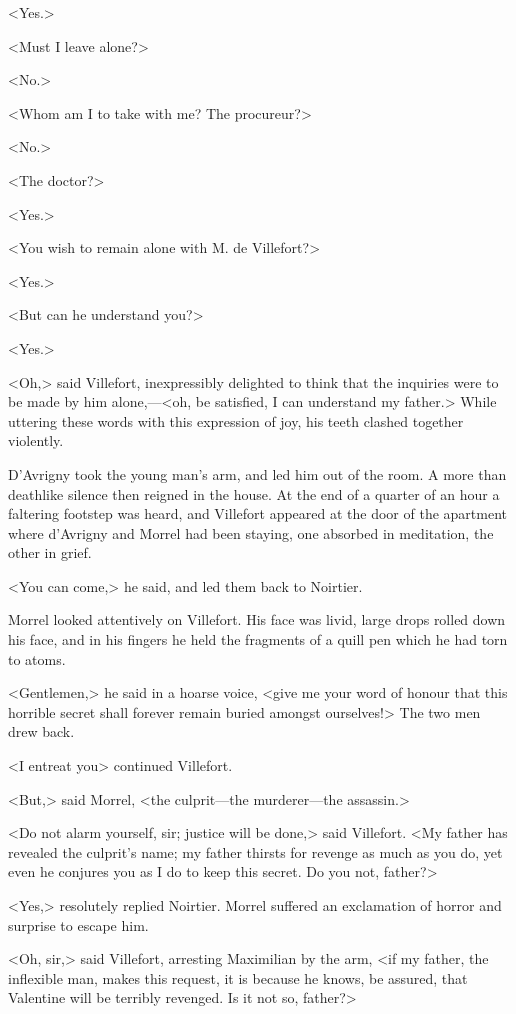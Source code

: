  <Yes.> 

 <Must I leave alone?> 

 <No.> 

 <Whom am I to take with me? The procureur?> 

 <No.> 

 <The doctor?> 

 <Yes.> 

 <You wish to remain alone with M. de Villefort?> 

 <Yes.> 

 <But can he understand you?> 

 <Yes.> 

 <Oh,> said Villefort, inexpressibly delighted to think that the inquiries were to be made by him alone,—<oh, be satisfied, I can understand my father.> While uttering these words with this expression of joy, his teeth clashed together violently. 

 D'Avrigny took the young man's arm, and led him out of the room. A more than deathlike silence then reigned in the house. At the end of a quarter of an hour a faltering footstep was heard, and Villefort appeared at the door of the apartment where d'Avrigny and Morrel had been staying, one absorbed in meditation, the other in grief. 

 <You can come,> he said, and led them back to Noirtier. 

 Morrel looked attentively on Villefort. His face was livid, large drops rolled down his face, and in his fingers he held the fragments of a quill pen which he had torn to atoms. 

 <Gentlemen,> he said in a hoarse voice, <give me your word of honour that this horrible secret shall forever remain buried amongst ourselves!> The two men drew back. 

 <I entreat you\longdash> continued Villefort. 

 <But,> said Morrel, <the culprit—the murderer—the assassin.> 

 <Do not alarm yourself, sir; justice will be done,> said Villefort. <My father has revealed the culprit's name; my father thirsts for revenge as much as you do, yet even he conjures you as I do to keep this secret. Do you not, father?> 

 <Yes,> resolutely replied Noirtier. Morrel suffered an exclamation of horror and surprise to escape him. 

 <Oh, sir,> said Villefort, arresting Maximilian by the arm, <if my father, the inflexible man, makes this request, it is because he knows, be assured, that Valentine will be terribly revenged. Is it not so, father?> 


